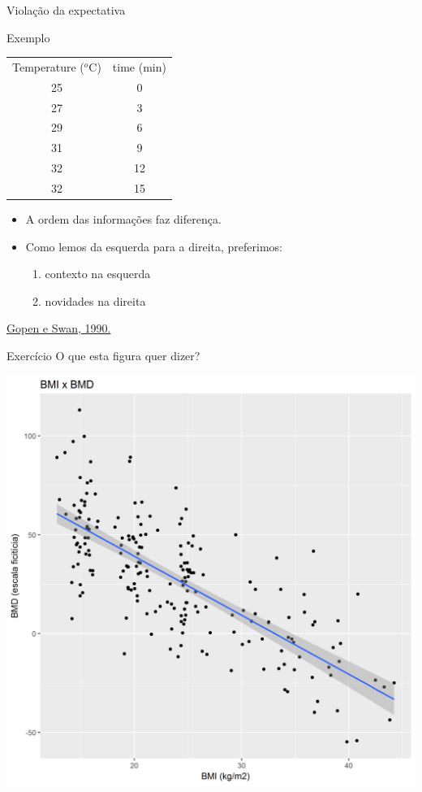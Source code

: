 \documentclass{beamer}
\begin{document}
\begin{frame}{Violação da expectativa}
  \begin{exampleblock}{Exemplo}
    \footnotesize
    \begin{center}
    \begin{tabular}{cc}
      Temperature ($^o$C) & time (min) \\
      25 & 0 \\
      27 & 3 \\
      29 & 6\\
      31 & 9\\
      32 & 12\\
      32 & 15 \\
    \end{tabular}
  \end{center}
  \end{exampleblock}
  \begin{itemize}
    \footnotesize
  \item A \alert{ordem} das informações faz diferença.
  \item Como lemos da esquerda para a direita, preferimos:
    \begin{enumerate}
      \scriptsize
    \item contexto na esquerda
    \item novidades na direita
    \end{enumerate}
  \end{itemize}

  \vfill
  \scriptsize
  \hfill \href{https://www.georgegopen.com/uploads/1/0/9/0/109073507/gopen___swan_sci_of_sci_writing_am_sci_1990_.pdf}{Gopen e Swan, 1990.}
\end{frame}

\begin{frame}{Exercício}
  O que esta figura quer dizer?
  \begin{center}
    \includegraphics[height=.8\textheight]{Escrita/exercicio-figura}
  \end{center}
\end{frame}
\end{document}
